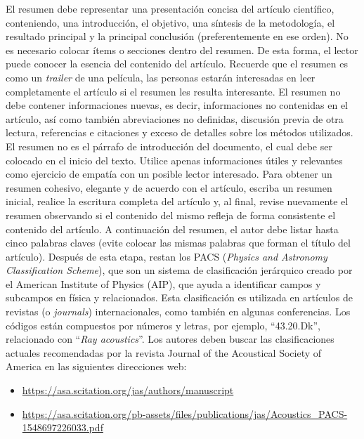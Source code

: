 \documentclass[12pt, a4paper, twoside, twocolumn]{article}
\begin{document}
El resumen debe representar una presentación concisa del artículo científico, conteniendo, una introducción, el objetivo, una síntesis de la metodología, el resultado principal y la principal conclusión (preferentemente en ese orden). No es necesario colocar ítems o secciones dentro del resumen. De esta forma, el lector puede conocer la esencia del contenido del artículo. Recuerde que el resumen es como un \textit{trailer} de una película, las personas estarán interesadas en leer completamente el artículo si el resumen les resulta interesante. El resumen no debe contener informaciones nuevas, es decir, informaciones no contenidas en el artículo, así como también abreviaciones no definidas, discusión previa de otra lectura, referencias e citaciones y exceso de detalles sobre los métodos utilizados. El resumen no es el párrafo de introducción del documento, el cual debe ser colocado en el inicio del texto. Utilice apenas informaciones útiles y relevantes como ejercicio de empatía con un posible lector interesado. Para obtener un resumen cohesivo, elegante y de acuerdo con el artículo, escriba un resumen inicial, realice la escritura completa del artículo y, al final, revise nuevamente el resumen observando si el contenido del mismo refleja de forma consistente el contenido del artículo. 
A continuación del resumen, el autor debe listar hasta cinco palabras claves (evite colocar las mismas palabras que forman el título del artículo). Después de esta etapa, restan los PACS (\textit{Physics and Astronomy Classification Scheme}), que son un sistema de clasificación jerárquico creado por el  American Institute of Physics (AIP), que ayuda a identificar campos y subcampos en física y relacionados. Esta clasificación es utilizada en artículos de revistas (o \textit{journals}) internacionales, como también en algunas conferencias. Los códigos están compuestos por números y letras, por ejemplo, ``43.20.Dk'', relacionado con ``\textit{Ray acoustics}''. Los autores deben buscar las clasificaciones actuales recomendadas por la revista Journal of the Acoustical Society of America en las siguientes direcciones web:

\begin{itemize}[noitemsep,topsep=-1ex] \itemsep=8pt
	\item \url{https://asa.scitation.org/jas/authors/manuscript}
	\item \url{https://asa.scitation.org/pb-assets/files/publications/jas/Acoustics_PACS-1548697226033.pdf}
\end{itemize}
%
\end{document}
